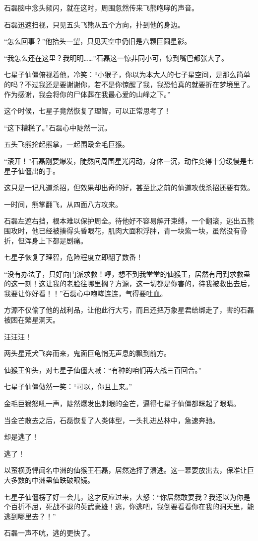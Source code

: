 \begin{this_body}
石磊脑中念头频闪，就在这时，周围忽然传来飞熊咆哮的声音。

石磊迅速扫视，只见五头飞熊从五个方向，扑到他的身边。

“怎么回事？”他抬头一望，只见天空中仍旧是六颗巨圆星影。

“我怎么还在这里？我明明……”石磊这一惊非同小可，惊到嘴巴都张大了。

七星子仙僵俯视着他，冷笑：“小猴子，你以为本大人的七子星空间，是那么简单的吗？不过我还是要谢谢你，若不是你惊醒了我，我恐怕真的就要折在梦境里了。作为感谢，我会将你的尸体葬在我最心爱的山峰之下。”

这个时候，七星子竟然恢复了理智，可以正常思考了！

“这下糟糕了。”石磊心中陡然一沉。

五头飞熊抡起熊掌，一起围殴金毛巨猴。

“滚开！”石磊刚要爆发，陡然间周围星光闪动，身体一沉，动作变得十分缓慢是七星子仙僵出的手。

这只是一记凡道杀招，但效果却出奇的好，甚至比之前的仙道攻伐杀招还要有效。

一时间，熊掌翻飞，从四面八方攻来。

石磊左遮右挡，根本难以保护周全。待他好不容易解开束缚，一个翻滚，逃出五熊围攻时，他已经被揍得头昏眼花，肌肉大面积浮肿，青一块紫一块，虽然没有骨折，但浑身上下都是剧痛。

七星子恢复了理智，危险程度立即翻了数番！

“没有办法了，只好向门派求救！哼，想不到我堂堂的仙猴王，居然有用到求救蛊的这一刻！这让我的老脸往哪里搁？方源，这一切都是你害的，待我被救出去后，我要让你好看！！”石磊心中咆哮连连，气得要吐血。

方源不仅偷了他的战利品，让他此行大亏，而且还把万象星君给绑走了，害的石磊被困在繁星洞天。

汪汪汪！

两头星荒犬飞奔而来，鬼面巨龟悄无声息的飘到前方。

仙猴王仰头，对七星子仙僵大喊：“有种的咱们再大战三百回合。”

七星子仙僵傲然一笑：“可以，你且上来。”

金毛巨猴怒吼一声，陡然爆发出刺眼的金芒，逼得七星子仙僵都眯起了眼睛。

当金芒散去之后，石磊恢复了人类体型，一头扎进丛林中，急速奔驰。

却是逃了！

逃了！

以蛮横勇悍闻名中洲的仙猴王石磊，居然选择了溃逃。这一幕要放出去，保准让巨大多数的中洲蛊仙跌破眼镜。

七星子仙僵楞了好一会儿，这才反应过来，大怒：“你居然敢耍我？我还以为你是个百折不屈，死战不退的英武豪雄！逃，你逃吧，我倒要看看你在我的洞天里，能逃到哪里去？！”

石磊一声不吭，逃的更快了。

\end{this_body}

